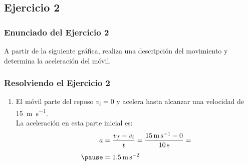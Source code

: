 \documentclass[14pt]{beamer}
\begin{document}
\subsection{Ejercicio 2}

\begin{frame}
\frametitle{Enunciado del Ejercicio 2}
A partir de la siguiente gráfica, realiza una descripción del movimiento y determina la aceleración del móvil.
\pause
\begin{figure}
     \centering
\end{figure}
\end{frame}
\begin{frame}
\frametitle{Resolviendo el Ejercicio 2}
\begin{enumerate}[<+->]
\item El móvil parte del reposo \pause $v_{i} = 0$ y acelera hasta alcanzar una velocidad de \SI{15}{\meter\per\second}.
\\
\bigskip
\pause
La aceleración en esta parte inicial es:
\pause
\begin{eqnarray*}
\begin{aligned}
a &= \dfrac{v_{f} - v_{i}}{t} = \dfrac{\SI{15}{\meter\per\second} - 0}{\SI{10}{\second}} = \\[0.5em] \pause
&= \SI{1.5}{\meter\per\square\second}
\end{aligned}
\end{eqnarray*}
\seti
\end{enumerate}
\end{frame}
\end{document}
